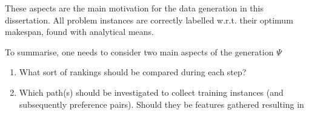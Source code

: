 These aspects are the main motivation for the data generation in this 
dissertation. 
All problem instances are correctly labelled w.r.t. their optimum makespan, 
found with analytical means. %

To summarise, one needs to consider two main aspects of the generation $\Psi$
\begin{enumerate}[after={{}}, leftmargin=*, label={\textbf{PREF.\arabic*}}, 
ref={{PREF.\arabic*}}]
    \item What sort of rankings should be compared during each step?
    \item Which path(s) should be investigated to collect training instances 
    (and subsequently preference pairs). Should they be features gathered 
    resulting in
\end{enumerate}

